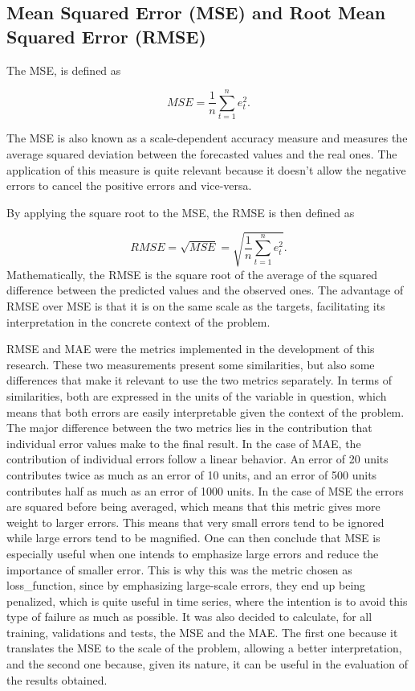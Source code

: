 \subsection{Mean Squared Error (MSE) and Root Mean Squared Error (RMSE)}

The \ac{MSE}, is defined as

\begin{equation}
     MSE =\frac {1}{n}\sum_{t=1}^ne_t^2.
\label{mse}
\end{equation}

The \ac{MSE} is also known as a scale-dependent accuracy measure and measures the average squared deviation between the forecasted values and the real ones. The application of this measure is quite relevant because it doesn't allow the negative errors to cancel the positive errors and vice-versa. 

By applying the square root to the \ac{MSE}, the \ac{RMSE} is then defined as

\begin{equation}
     RMSE =\sqrt{MSE} = \sqrt{\frac {1}{n}\sum_{t=1}^ne_t^2}.
\label{rmse}
\end{equation}
Mathematically, the \ac{RMSE} is the square root of the average of the squared difference between the predicted values and the observed ones. The advantage of \ac{RMSE} over \ac{MSE} is that it is on the same scale as the targets, facilitating its interpretation in the concrete context of the problem. 

\ac{RMSE} and \ac{MAE} were the metrics implemented in the development of this research. These two measurements present some similarities, but also some differences that make it relevant to use the two metrics separately. In terms of similarities, both are expressed in the units of the variable in question, which means that both errors are easily interpretable given the context of the problem. The major difference between the two metrics lies in the contribution that individual error values make to the final result. In the case of \ac{MAE}, the contribution of individual errors follow a linear behavior. An error of 20 units contributes twice as much as an error of 10 units, and an error of 500 units contributes half as much as an error of 1000 units. In the case of \ac{MSE} the errors are squared before being averaged, which means that this metric gives more weight to larger errors.  This means that very small errors tend to be ignored while large errors tend to be magnified. One can then conclude that \ac{MSE} is especially useful when one intends to emphasize large errors and reduce the importance of smaller error. This is why this was the metric chosen as loss\_function, since by emphasizing large-scale errors, they end up being penalized, which is quite useful in time series, where the intention is to avoid this type of failure as much as possible. It was also decided to calculate, for all training, validations and tests, the \ac{MSE} and the \ac{MAE}. The first one because it translates the \ac{MSE} to the scale of the problem, allowing a better interpretation, and the second one because, given its nature, it can be useful in the evaluation of the results obtained.

